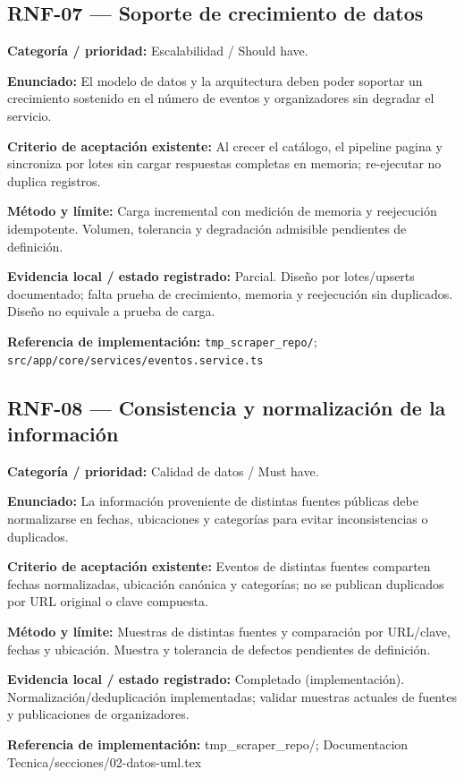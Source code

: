 \subsection{RNF-07 — Soporte de crecimiento de datos}
\textbf{Categoría / prioridad:} Escalabilidad / Should have.\par
\textbf{Enunciado:} El modelo de datos y la arquitectura deben poder soportar un crecimiento sostenido en el número de eventos y organizadores sin degradar el servicio.\par
\textbf{Criterio de aceptación existente:} Al crecer el catálogo, el pipeline pagina y sincroniza por lotes sin cargar respuestas completas en memoria; re-ejecutar no duplica registros.\par
\textbf{Método y límite:} Carga incremental con medición de memoria y reejecución idempotente. Volumen, tolerancia y degradación admisible pendientes de definición.\par
\textbf{Evidencia local / estado registrado:} Parcial. Diseño por lotes/upserts documentado; falta prueba de crecimiento, memoria y reejecución sin duplicados. Diseño no equivale a prueba de carga.\par
\textbf{Referencia de implementación:} \nolinkurl{tmp_scraper_repo/}; \nolinkurl{src/app/core/services/eventos.service.ts}\par

\subsection{RNF-08 — Consistencia y normalización de la información}
\textbf{Categoría / prioridad:} Calidad de datos / Must have.\par
\textbf{Enunciado:} La información proveniente de distintas fuentes públicas debe normalizarse en fechas, ubicaciones y categorías para evitar inconsistencias o duplicados.\par
\textbf{Criterio de aceptación existente:} Eventos de distintas fuentes comparten fechas normalizadas, ubicación canónica y categorías; no se publican duplicados por URL original o clave compuesta.\par
\textbf{Método y límite:} Muestras de distintas fuentes y comparación por URL/clave, fechas y ubicación. Muestra y tolerancia de defectos pendientes de definición.\par
\textbf{Evidencia local / estado registrado:} Completado (implementación). Normalización/deduplicación implementadas; validar muestras actuales de fuentes y publicaciones de organizadores.\par
\textbf{Referencia de implementación:} tmp\_scraper\_repo/; Documentacion Tecnica/secciones/02-datos-uml.tex\par

